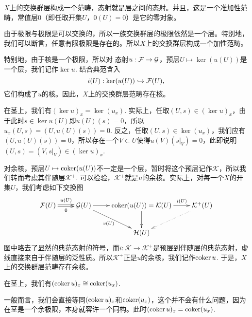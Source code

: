 \begin{para}[交换群层范畴]
$X$上的交换群层构成一个范畴，态射就是层之间的态射。并且，这是一个准加性范畴，常值层$0$（即任取开集$U$，$0(U)=0$）是它的零对象。

由于极限与极限是可以交换的，所以一族交换群层的极限依然是一个层。特别地，我们可以断言，任意有限极限是存在的。所以$X$上的交换群层构成一个加性范畴。

特别地，由于核是一个极限，所以对
态射$u:\mathcal{F}\to\mathcal{G}$，预层$U\mapsto \ker(u(U))$是一个层，我们记作$\ker u$. 结合典范含入
\[
	i(U):\ker(u(U))\hookrightarrow \mathcal{F}(U),
\]
它们构成了$u$的核。因此，$X$上的交换群层范畴存在核。

在茎上，我们有$(\ker u)_x=\ker(u_x)$. 实际上，任取$(U,s)\in (\ker u)_x$，由于此时$s\in \ker u(U)$即$u(U)(s)=0$，所以$u_x(U,s)=(U,u(U)(s))=0$. 反之，任取$(U,s)\in \ker(u_x)$，我们应有$(U,u(U)(s))=0$，所以存在一个$V\subset U$使得$u(V)(s|_V)=0$，此即说明$(U,s)=(V,s|_V)\in (\ker u)_x$.

对余核，预层$U\mapsto \operatorname{coker}(u(U))$不一定是一个层，暂时将这个预层记作$\mathcal{K}$，所以我们转而考虑其伴随层$\mathcal{K}^+$. 可以检验，$\mathcal{K}^+$就是$u$的余核。实际上，对每一个$X$的开集$U$，我们考虑如下交换图
\[
	\xymatrix{
		\calf(U)\ar@<0.3ex>[r]^-{u(U)} \ar@<-0.3ex>[r]_-{0}&\calg(U)\ar[r]\ar[dr]_-{v(U)}&\coker(u(U))=\mathcal{K}(U)\ar[d]\ar[r]^-{i(U)}&\mathcal{K}^+(U)\ar@{.>}[ld]\\
		&&\mathcal{H}(U)&
	}
\]
图中略去了显然的典范态射的符号，而$i:\mathcal{K}\to \mathcal{K}^+$是预层到伴随层的典范态射，虚线直接来自于伴随层的泛性质。所以$\mathcal{K}^+$正是$u$的余核，我们记作$\operatorname{coker} u$. 于是，$X$上的交换群层范畴存在余核。
\end{para}

\begin{lem}
在茎上，我们有$(\operatorname{coker} u)_x\cong \operatorname{coker}(u_x)$. 
\end{lem}

一般而言，我们会直接等同$(\operatorname{coker} u)_x$和$\operatorname{coker}(u_x)$，这个并不会有什么问题，因为在茎是一个余极限，本身就容许一个同构。此时$(\operatorname{coker} u)_x=\operatorname{coker}(u_x)$.

